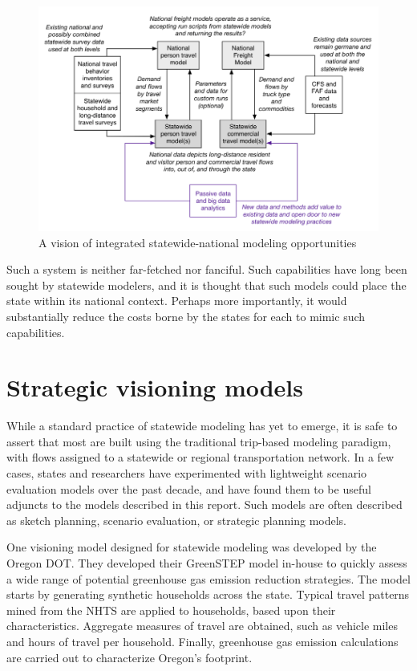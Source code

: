 \begin{figure}[!t]   %
\centering
\includegraphics[width=6.5in]{graphics/41-integrated-modeling-opportunities}  
\caption{A vision of integrated statewide-national modeling opportunities}
\label{fig:integrated-opportunities}
\end{figure}

Such a system is neither far-fetched nor fanciful. Such capabilities have long been sought by statewide modelers, and it is thought that such models could place the state within its national context. Perhaps more importantly, it would substantially reduce the costs borne by the states for each to mimic such capabilities.

\section{Strategic visioning models}\label{sec:strategic-visioning-models}

While a standard practice of statewide modeling has yet to emerge, it is safe to assert that most are built using the traditional trip-based modeling paradigm, with flows assigned to a statewide or regional transportation network. In a few cases, states and researchers have experimented with lightweight scenario evaluation models over the past decade, and have found them to be useful adjuncts to the models described in this report. Such models are often described as sketch planning, scenario evaluation, or strategic planning models.

One visioning model designed for statewide modeling was developed by the Oregon DOT. They developed their GreenSTEP model in-house to quickly assess a wide range of potential greenhouse gas emission reduction strategies. The model starts by generating synthetic households across the state. Typical travel patterns mined from the NHTS are applied to households, based upon their characteristics. Aggregate measures of travel are obtained, such as vehicle miles and hours of travel per household. Finally, greenhouse gas emission calculations are carried out to characterize Oregon's footprint.

